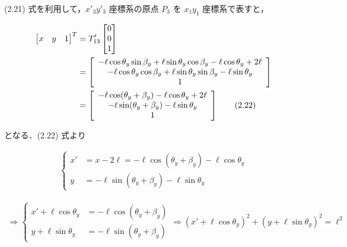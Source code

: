     (2.21) 式を利用して，$x'_3 y'_3$ 座標系の原点 $P_3$ を $x_1 y_1$ 座標系で表すと，

    \begin{align}
        \begin{bmatrix}
        x & y & 1
        \end{bmatrix}^T
        &= T'_{13}
        \begin{bmatrix}
        0 \\ 0 \\ 1
        \end{bmatrix}
        \notag \\
        &=
        \left[
        \begin{array}{c}
        -\ell \cos\theta_y \sin\beta_y + \ell \sin\theta_y \cos\beta_y - \ell \cos\theta_y + 2\ell \\
        -\ell \cos\theta_y \cos\beta_y + \ell \sin\theta_y \sin\beta_y - \ell \sin\theta_y \\
        1
        \end{array}
        \right]
        \notag \\
        &=
        \left[
        \begin{array}{c}
        -\ell \cos(\theta_y + \beta_y) - \ell \cos\theta_y + 2\ell \\
        -\ell \sin(\theta_y + \beta_y) - \ell \sin\theta_y \\
        1
        \end{array}
        \right]
        \tag{2.22}
        \end{align}
        
    
    となる．(2.22) 式より
    
    \begin{align}
    \left\{
    \begin{aligned}
    x' &= x - 2\ell = -\ell \cos(\theta_y + \beta_y) - \ell \cos\theta_y \\
    y &= -\ell \sin(\theta_y + \beta_y) - \ell \sin\theta_y
    \end{aligned}
    \right.
    \tag{2.23}
    \end{align}
    
    \begin{align}
    \Longrightarrow
    \left\{
    \begin{aligned}
    x' + \ell \cos\theta_y &= -\ell \cos(\theta_y + \beta_y) \\
    y + \ell \sin\theta_y &= -\ell \sin(\theta_y + \beta_y)
    \end{aligned}
    \right.
    \Longrightarrow
    (x' + \ell \cos\theta_y)^2 + (y + \ell \sin\theta_y)^2 = \ell^2
    \tag{2.24}
    \end{align}
    
